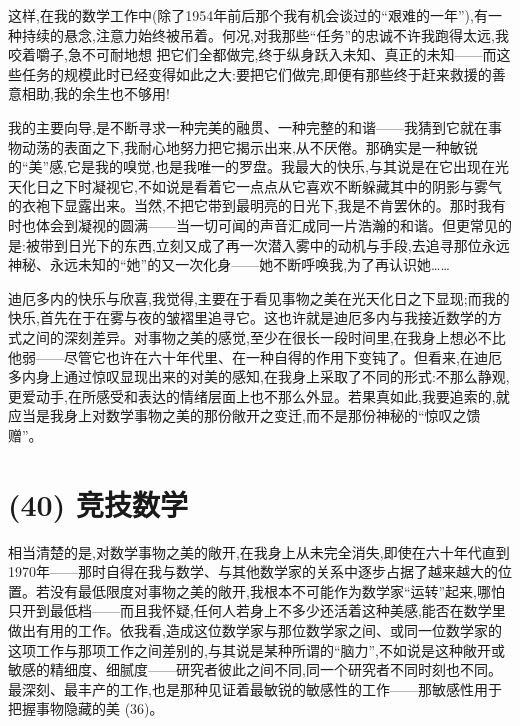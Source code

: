 这样,在我的数学工作中(除了1954年前后那个我有机会谈过的“艰难的一年”),有一种持续的悬念,注意力始终被吊着。何况,对我那些“任务”的忠诚不许我跑得太远,我咬着嚼子,急不可耐地想
 把它们全都做完,终于纵身跃入未知、真正的未知——而这些任务的规模此时已经变得如此之大:要把它们做完,即便有那些终于赶来救援的善意相助,我的余生也不够用!

我的主要向导,是不断寻求一种完美的融贯、一种完整的和谐——我猜到它就在事物动荡的表面之下,我耐心地努力把它揭示出来,从不厌倦。那确实是一种敏锐的“美”感,它是我的嗅觉,也是我唯一的罗盘。我最大的快乐,与其说是在它出现在光天化日之下时凝视它,不如说是看着它一点点从它喜欢不断躲藏其中的阴影与雾气的衣袍下显露出来。当然,不把它带到最明亮的日光下,我是不肯罢休的。那时我有时也体会到凝视的圆满——当一切可闻的声音汇成同一片浩瀚的和谐。但更常见的是:被带到日光下的东西,立刻又成了再一次潜入雾中的动机与手段,去追寻那位永远神秘、永远未知的“她”的又一次化身——她不断呼唤我,为了再认识她……

 迪厄多内的快乐与欣喜,我觉得,主要在于看见事物之美在光天化日之下显现;而我的快乐,首先在于在雾与夜的皱褶里追寻它。这也许就是迪厄多内与我接近数学的方式之间的深刻差异。对事物之美的感觉,至少在很长一段时间里,在我身上想必不比他弱——尽管它也许在六十年代里、在一种自得的作用下变钝了。但看来,在迪厄多内身上通过惊叹显现出来的对美的感知,在我身上采取了不同的形式:不那么静观,更爱动手,在所感受和表达的情绪层面上也不那么外显。若果真如此,我要追索的,就应当是我身上对数学事物之美的那份敞开之变迁,而不是那份神秘的“惊叹之馈赠”。

\section{(40) 竞技数学}

相当清楚的是,对数学事物之美的敞开,在我身上从未完全消失,即使在六十年代直到1970年——那时自得在我与数学、与其他数学家的关系中逐步占据了越来越大的位置。若没有最低限度对事物之美的敞开,我根本不可能作为数学家“运转”起来,哪怕只开到最低档——而且我怀疑,任何人若身上不多少还活着这种美感,能否在数学里做出有用的工作。依我看,造成这位数学家与那位数学家之间、或同一位数学家的这项工作与那项工作之间差别的,与其说是某种所谓的“脑力”,不如说是这种敞开或敏感的精细度、细腻度——研究者彼此之间不同,同一个研究者不同时刻也不同。最深刻、最丰产的工作,也是那种见证着最敏锐的敏感性的工作——那敏感性用于把握事物隐藏的美 (36)。

